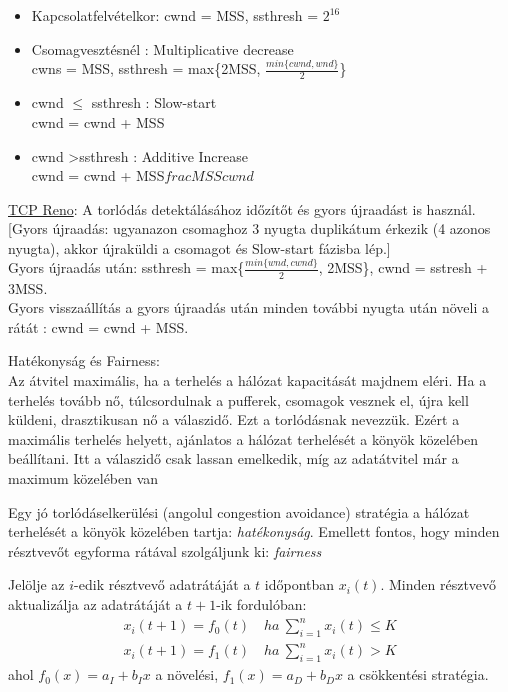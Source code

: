 \documentclass[margin=0px]{article}
\begin{document}
\begin{description}
\begin{itemize}
						\begin{itemize}
							\item Kapcsolatfelvételkor: cwnd = MSS, ssthresh = $2^{16}$
							\item Csomagvesztésnél : Multiplicative decrease \\ 
								cwns = MSS, ssthresh = 	max\{2MSS, $\frac{min\{cwnd, wnd\}}{2}$\}
							\item cwnd $\leq $ ssthresh : Slow-start \\
								cwnd = cwnd + MSS
							\item cwnd \textgreater ssthresh : Additive Increase \\
								cwnd = 	cwnd + MSS$frac{MSS}{cwnd}$
						\end{itemize}
						\underline{TCP Reno}: A torlódás detektálásához időzítőt és gyors újraadást is használ. [Gyors újraadás: ugyanazon csomaghoz 3 nyugta duplikátum érkezik (4 azonos nyugta), akkor újraküldi a csomagot és Slow-start fázisba lép.] \\
						Gyors újraadás után: ssthresh = max\{$\frac{min\{wnd,cwnd\}}{2}$, 2MSS\}, cwnd = sstresh + 3MSS. \\
						Gyors visszaállítás a gyors újraadás után minden további nyugta után növeli a rátát : cwnd = cwnd + MSS.
				\end{itemize}

				Hatékonyság és Fairness: \\
				Az átvitel maximális, ha a terhelés a hálózat kapacitását majdnem eléri. Ha a terhelés tovább nő, túlcsordulnak a pufferek, csomagok vesznek el, újra kell küldeni, drasztikusan nő a válaszidő. Ezt a torlódásnak nevezzük. Ezért a maximális terhelés helyett, ajánlatos a hálózat terhelését a könyök közelében beállítani. Itt a válaszidő csak lassan emelkedik, míg az adatátvitel már a maximum közelében van
				
				Egy jó torlódáselkerülési (angolul congestion avoidance) stratégia a hálózat terhelését a könyök közelében tartja: \textit{hatékonyság}. Emellett fontos, hogy minden résztvevőt egyforma rátával szolgáljunk ki: \textit{fairness}
				
				Jelölje az $i$-edik résztvevő adatrátáját a $t$ időpontban $x_i(t)$.
				Minden résztvevő aktualizálja az adatrátáját a $t+1$-ik fordulóban:
				\begin{align*}
					x_i(t+1) = f_0(t) \quad  ha \ \sum_{i=1}^{n}x_i(t) \leq K \\
					x_i(t+1) = f_1(t) \quad  ha \ \sum_{i=1}^{n}x_i(t) > K
				\end{align*}
				ahol $f_0(x) = a_I + b_Ix$ a növelési, $f_1(x) = a_D + b_Dx$ a csökkentési stratégia.
				

\end{description}
\end{document}
